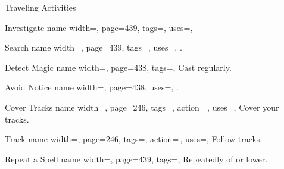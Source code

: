 \begin{PageFront}
\begin{Tables}{\frontTableHeight}
\begin{Table}{Traveling Activities}
\begin{entry}{Investigate}{%
                name width=\activityLength,%
                page=439,
                tags=\Concentrate,
                uses={\VariousKnowledge[tags=S]},
            }
            \end{entry}
            \begin{entry}{Search}{%
                name width=\activityLength,%
                page=439,
                tags=\Concentrate,
                uses={\Perception[tags=S]},
            }
                . \hfill {}
            \end{entry}
            \begin{entry}{Detect Magic}{%
                name width=\activityLength,%
                page=438,
                tags=\Concentrate,
            }
                Cast  regularly.\hfill {}
            \end{entry}
            \breakLine
            \begin{entry}{Avoid Notice}{%
                name width=\activityLength,%
                page=438,
                uses={\Stealth[tags=S]},
            }
                .  \hfill{}\quad {}
            \end{entry}
            \begin{entry}{Cover Tracks}{%
                name width=\activityLength,%
                page=246,
                tags=\Move\Concentrate,
                action=\,,
                uses={\Survival[tags=T]},
            }
                Cover your tracks.
            \end{entry}
            \begin{entry}{Track}{%
                name width=\activityLength,%
                page=246,
                tags=\Move\Concentrate,
                action=\,,
                uses={\Survival[tags=T]},
            }
                Follow tracks.\hfill {}\quad {}
            \end{entry}
            \breakLine
            \begin{entry}{Repeat a Spell}{%
                name width=\activityLength,%
                page=439,
                tags=\Concentrate,
            }
                Repeatedly  of or lower.\hfill{}

\end{entry}
\end{Table}
\end{Tables}
\end{PageFront}
